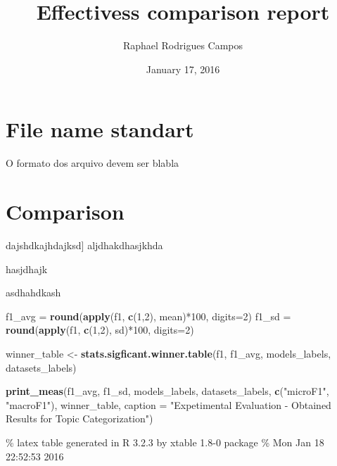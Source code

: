 \documentclass[]{article}
\title{Effectivess comparison report}
\author{Raphael Rodrigues Campos}
\date{January 17, 2016}
\newenvironment{Shaded}{\begin{snugshade}}{\end{snugshade}}
\newcommand{\KeywordTok}[1]{\textcolor[rgb]{0.13,0.29,0.53}{\textbf{{#1}}}}
\newcommand{\DataTypeTok}[1]{\textcolor[rgb]{0.13,0.29,0.53}{{#1}}}
\newcommand{\DecValTok}[1]{\textcolor[rgb]{0.00,0.00,0.81}{{#1}}}
\newcommand{\StringTok}[1]{\textcolor[rgb]{0.31,0.60,0.02}{{#1}}}
\newcommand{\NormalTok}[1]{{#1}}
\begin{document}
\maketitle


\section{File name standart}\label{file-name-standart}

O formato dos arquivo devem ser blabla

\section{Comparison}\label{comparison}

dajshdkajhdajksd{]} aljdhakdhasjkhda

hasjdhajk

asdhahdkash

\begin{Shaded}
\begin{Highlighting}[]
\NormalTok{f1_avg =}\StringTok{ }\KeywordTok{round}\NormalTok{(}\KeywordTok{apply}\NormalTok{(f1, }\KeywordTok{c}\NormalTok{(}\DecValTok{1}\NormalTok{,}\DecValTok{2}\NormalTok{), mean)*}\DecValTok{100}\NormalTok{, }\DataTypeTok{digits=}\DecValTok{2}\NormalTok{)}
\NormalTok{f1_sd =}\StringTok{ }\KeywordTok{round}\NormalTok{(}\KeywordTok{apply}\NormalTok{(f1, }\KeywordTok{c}\NormalTok{(}\DecValTok{1}\NormalTok{,}\DecValTok{2}\NormalTok{), sd)*}\DecValTok{100}\NormalTok{, }\DataTypeTok{digits=}\DecValTok{2}\NormalTok{)}

\NormalTok{winner_table <-}\StringTok{ }\KeywordTok{stats.sigficant.winner.table}\NormalTok{(f1, f1_avg, models_labels, datasets_labels)}

\KeywordTok{print_meas}\NormalTok{(f1_avg, f1_sd, models_labels, datasets_labels,}
           \KeywordTok{c}\NormalTok{(}\StringTok{"microF1"}\NormalTok{, }\StringTok{"macroF1"}\NormalTok{), winner_table, }
           \DataTypeTok{caption =} \StringTok{"Expetimental Evaluation - Obtained Results for Topic Categorization"}\NormalTok{)}
\end{Highlighting}
\end{Shaded}

\% latex table generated in R 3.2.3 by xtable 1.8-0 package \% Mon Jan
18 22:52:53 2016
\end{document}

